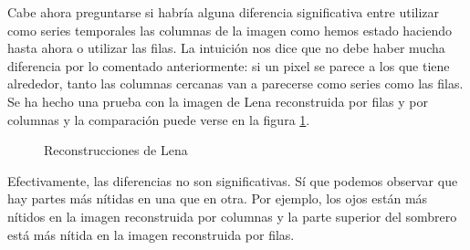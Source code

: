 Cabe ahora preguntarse si habría alguna diferencia significativa entre utilizar como series temporales las columnas de la imagen como hemos estado haciendo hasta ahora o utilizar las filas. La intuición nos dice que no debe haber mucha diferencia por lo comentado anteriormente: si un pixel se parece a los que tiene alrededor, tanto las columnas cercanas van a parecerse como series como las filas. Se ha hecho una prueba con la imagen de Lena reconstruida por filas y por columnas y la comparación puede verse en la figura \ref{f:comparativaFilas}.\\

\begin{figure}
 \centering
 \caption{Reconstrucciones de Lena}
 \label{f:comparativaFilas}
\end{figure}

Efectivamente, las diferencias no son significativas. Sí que podemos observar que hay partes más nítidas en una que en otra. Por ejemplo, los ojos están más nítidos en la imagen reconstruida por columnas y la parte superior del sombrero está más nítida en la imagen reconstruida por filas.\\

